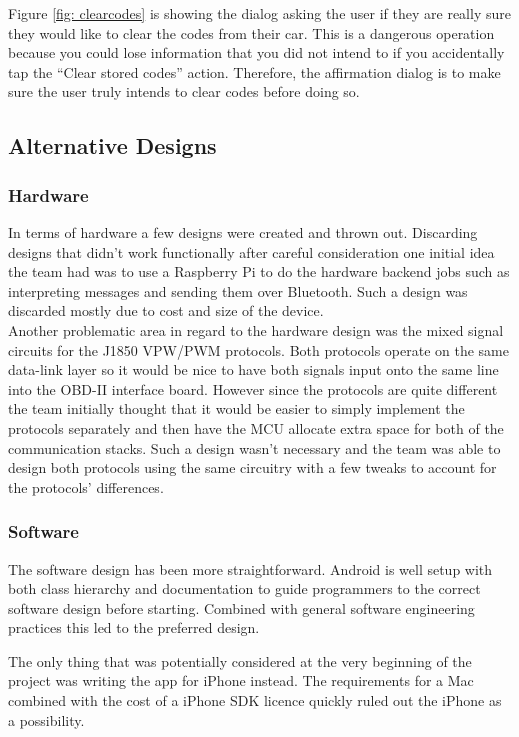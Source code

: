 \documentclass[12pt,letterpaper]{article}
\begin{document}
Figure \ref{fig: clearcodes} is showing the dialog asking the user if
they are really sure they would like to clear the codes from their
car. This is a dangerous operation because you could lose information
that you did not intend to if you accidentally tap the ``Clear stored
codes'' action. Therefore, the affirmation dialog is to make sure the
user truly intends to clear codes before doing so.

\subsection{Alternative Designs}
\subsubsection{Hardware}
In terms of hardware a few designs were created and thrown out. Discarding designs that didn't work functionally after careful consideration one initial idea the team had was to use a Raspberry Pi to do the hardware backend jobs such as interpreting messages and sending them over Bluetooth. Such a design was discarded mostly due to cost and size of the device.\\ 

Another problematic area in regard to the hardware design was the mixed signal circuits for the J1850 VPW/PWM protocols. Both protocols operate on the same data-link layer so it would be nice to have both signals input onto the same line into the OBD-II interface board. However since the protocols are quite different the team initially thought that it would be easier to simply implement the protocols separately and then have the MCU allocate extra space for both of the communication stacks. Such a design wasn't necessary and the team was able to design both protocols using the same circuitry with a few tweaks to account for the protocols' differences.

\subsubsection{Software}
The software design has been more straightforward. Android is well setup with both class hierarchy and documentation to guide programmers to the correct software design before starting. Combined with general software engineering practices this led to the preferred design. 

The only thing that was potentially considered at the very beginning of the project was writing the app for iPhone instead. The requirements for a Mac combined with the cost of a iPhone SDK licence quickly ruled out the iPhone as a possibility. 
\end{document}
